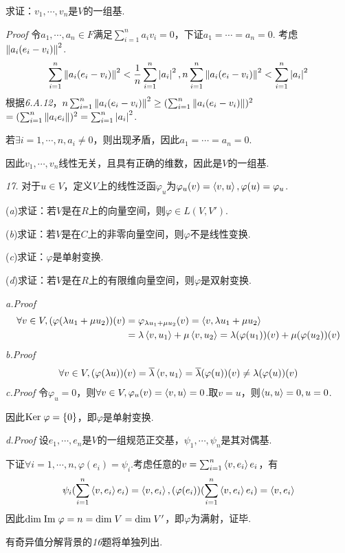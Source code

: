 求证：\(v_1,\cdots,v_n\)是\(V\)的一组基.

\textit{Proof}
令\(a_1,\cdots,a_n \in F\)满足\(\sum_{i=1}^n a_iv_i=0\)，下证\(a_1=\cdots=a_n=0\).
考虑\(\left\lVert a_i(e_i-v_i) \right\rVert^2\).
    \begin{align*}
        \sum_{i=1}^n \left\lVert a_i(e_i-v_i) \right\rVert^2<\dfrac{1}{n}\sum_{i=1}^n \left\lvert a_i \right\rvert^2,
        n\sum_{i=1}^n \left\lVert a_i(e_i-v_i) \right\rVert^2<\sum_{i=1}^n \left\lvert a_i \right\rvert^2
    \end{align*}
根据\textit{6.A.12}，\(n\sum_{i=1}^n \left\lVert a_i(e_i-v_i) \right\rVert^2 \geq (\sum_{i=1}^n \left\lVert a_i(e_i-v_i) \right\rVert)^2\)
\(=(\sum_{i=1}^n \left\lVert a_ie_i \right\rVert)^2=\sum_{i=1}^n \left\lvert a_i \right\rvert^2\).

若\(\exists i=1,\cdots,n,a_i \ne 0\)，则出现矛盾，因此\(a_1=\cdots=a_n=0\).

因此\(v_1,\cdots,v_n\)线性无关，且具有正确的维数，因此是\(V\)的一组基.

\newpage

\textit{17.}
对于\(u \in V\)，定义\(V\)上的线性泛函\(\varphi_u\)为\(\varphi_u(v)=\left\langle v,u \right\rangle,\varphi(u)=\varphi_u\).

(\textit{a})求证：若\(V\)是在\(R\)上的向量空间，则\(\varphi \in L(V,V')\).

(\textit{b})求证：若\(V\)是在\(C\)上的非零向量空间，则\(\varphi\)不是线性变换.

(\textit{c})求证：\(\varphi\)是单射变换.

(\textit{d})求证：若\(V\)是在\(R\)上的有限维向量空间，则\(\varphi\)是双射变换.

\textit{a.Proof}
    \begin{align*}
        \forall v \in V,(\varphi(\lambda u_1+\mu u_2))(v)
        &=\varphi_{\lambda u_1+\mu u_2}(v)=\left\langle v,\lambda u_1+\mu u_2 \right\rangle \\
        &=\lambda \left\langle v,u_1 \right\rangle+\mu \left\langle v,u_2 \right\rangle=\lambda (\varphi(u_1))(v)+\mu (\varphi(u_2))(v)
    \end{align*}
\textit{b.Proof}
    \begin{align*}
        \forall v \in V,(\varphi(\lambda u))(v)=\overline{\lambda} \left\langle v,u_1 \right\rangle
        =\overline{\lambda} (\varphi(u))(v) \ne \lambda (\varphi(u))(v)
    \end{align*}
\textit{c.Proof}
令\(\varphi_u=0\)，则\(\forall v \in V,\varphi_u(v)=\left\langle v,u \right\rangle=0\).取\(v=u\)，则\(\left\langle u,u \right\rangle=0,u=0\).

因此\(\mathrm{Ker \;} \varphi=\{0\}\)，即\(\varphi\)是单射变换.

\textit{d.Proof}
设\(e_1,\cdots,e_n\)是\(V\)的一组规范正交基，\(\psi_1,\cdots,\psi_n\)是其对偶基.

下证\(\forall i=1,\cdots,n,\varphi(e_i)=\psi_i\).考虑任意的\(v=\sum_{i=1}^n \left\langle v,e_i \right\rangle e_i\)，有
    \begin{align*}
        \psi_i(\sum_{i=1}^n \left\langle v,e_i \right\rangle e_i)=\left\langle v,e_i \right\rangle,
        (\varphi(e_i))(\sum_{i=1}^n \left\langle v,e_i \right\rangle e_i)=\left\langle v,e_i \right\rangle
    \end{align*}
因此\(\mathrm{dim \;} \mathrm{Im \;} \varphi=n=\mathrm{dim \;} V=\mathrm{dim \;} V'\)，即\(\varphi\)为满射，证毕.

有奇异值分解背景的\textit{16}题将单独列出.

